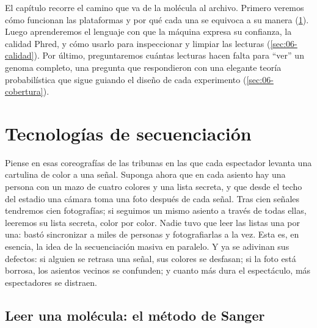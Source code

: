 El capítulo recorre el camino que va de la molécula al archivo. Primero veremos cómo funcionan las plataformas y por qué cada una se equivoca a su manera (\cref{sec:06-tecnologias}). Luego aprenderemos el lenguaje con que la máquina expresa su confianza, la calidad Phred, y cómo usarlo para inspeccionar y limpiar las lecturas (\cref{sec:06-calidad}). Por último, preguntaremos cuántas lecturas hacen falta para ``ver'' un genoma completo, una pregunta que \textcite{c06-lander1988} respondieron con una elegante teoría probabilística que sigue guiando el diseño de cada experimento (\cref{sec:06-cobertura}).

\section{Tecnologías de secuenciación}\label{sec:06-tecnologias}

\begin{intuicion}
Piense en esas coreografías de las tribunas en las que cada espectador levanta una cartulina de color a una señal. Suponga ahora que en cada asiento hay una persona con un mazo de cuatro colores y una lista secreta, y que desde el techo del estadio una cámara toma una foto después de cada señal. Tras cien señales tendremos cien fotografías; si seguimos un mismo asiento a través de todas ellas, leeremos su lista secreta, color por color. Nadie tuvo que leer las listas una por una: bastó sincronizar a miles de personas y fotografiarlas a la vez. Esta es, en esencia, la idea de la secuenciación masiva en paralelo. Y ya se adivinan sus defectos: si alguien se retrasa una señal, sus colores se desfasan; si la foto está borrosa, los asientos vecinos se confunden; y cuanto más dura el espectáculo, más espectadores se distraen.
\end{intuicion}

\subsection{Leer una molécula: el método de Sanger}

